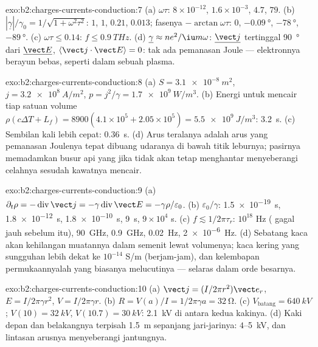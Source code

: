 \begin{solution}{exo:b2:charges-currents-conduction:7}
(a) $\omega\tau$: $8 \times 10^{-12}$, $1.6 \times 10^{-3}$, $4.7$, $79$. (b) $|\underline\gamma|/\gamma_0 =
1/\sqrt{1 + \omega^2\tau^2}$: $1$, $1$, $0.21$, $0.013$; fasenya $-\arctan\omega\tau$: $0$,
$-\qty{0.09}{\degree}$, $-\qty{78}{\degree}$, $-\qty{89}{\degree}$. (c) $\omega\tau \le 0.14$: $f \le
\qty{0.9}{THz}$. (d) $\underline\gamma \approx ne^2/\iu m\omega$: $\underline{\vect j}$ tertinggal
\qty{90}{\degree} dari $\underline{\vect E}$, $\langle\vect j\cdot\vect E\rangle = 0$: tak ada pemanasan
Joule --- elektronnya berayun bebas, seperti dalam sebuah plasma.
\end{solution}

\begin{solution}{exo:b2:charges-currents-conduction:8}
(a) $S = \qty{3.1e-8}{m^2}$, $j = \qty{3.2e8}{A/m^2}$, $p = j^2/\gamma = \qty{1.7e9}{W/m^3}$.
(b) Energi untuk mencair tiap satuan volume $\rho(c\Delta T + L_f) = 8900(4.1 \times 10^5 + 2.05 \times
10^5) = \qty{5.5e9}{J/m^3}$: \qty{3.2}{s}. (c) Sembilan kali lebih cepat: \qty{0.36}{s}. (d) Arus
teralanya adalah arus yang pemanasan Joulenya tepat dibuang udaranya
di bawah titik leburnya; pasirnya memadamkan busur api yang jika tidak
akan tetap menghantar menyeberangi celahnya sesudah kawatnya mencair.
\end{solution}

\begin{solution}{exo:b2:charges-currents-conduction:9}
(a) $\partial_t\rho = -\operatorname{div}\vect j = -\gamma\operatorname{div}\vect E = -\gamma\rho/
\varepsilon_0$. (b) $\varepsilon_0/\gamma$: \qty{1.5e-19}{s}, \qty{1.8e-12}{s}, \qty{1.8e-10}{s},
\qty{9}{s}, $9 \times 10^4$ s. (c) $f \lesssim 1/2\pi\tau_r$: $10^{18}$ Hz (
gagal jauh sebelum itu), \qty{90}{GHz}, \qty{0.9}{GHz}, \qty{0.02}{Hz}, \qty{2e-6}{Hz}. (d)
Sebatang kaca akan kehilangan muatannya dalam semenit lewat volumenya;
kaca kering yang sungguhan lebih dekat ke $10^{-14}$ S/m (berjam-jam), dan kelembapan
permukaannyalah yang biasanya melucutinya --- selaras dalam orde
besarnya.
\end{solution}

\begin{solution}{exo:b2:charges-currents-conduction:10}
(a) $\vect j = (I/2\pi r^2)\vect e_r$, $E = I/2\pi\gamma r^2$, $V = I/2\pi\gamma r$. (b) $R = V(a)
/I = 1/2\pi\gamma a = \qty{32}{\ohm}$. (c) $V_{\text{batang}} = \qty{640}{kV}$; $V(10) = \qty{32}{kV}$,
$V(10.7) = \qty{30}{kV}$: \qty{2.1}{kV} di antara kedua kakinya. (d) Kaki depan dan belakangnya
terpisah \qty{1.5}{m} sepanjang jari-jarinya: $4$--\qty{5}{kV}, dan lintasan arusnya
menyeberangi jantungnya.
\end{solution}

